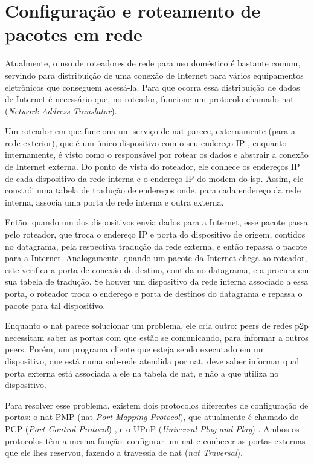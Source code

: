 
\section{Configuração e roteamento de pacotes em rede}

Atualmente, o uso de roteadores de rede para uso doméstico é bastante comum, servindo
para distribuição de uma conexão de Internet para vários equipamentos eletrônicos que
conseguem acessá-la. Para que ocorra essa distribuição de dados de Internet é
necessário que, no roteador, funcione um protocolo chamado \gls{nat}
(\emph{Network Address Translator}).

Um roteador em que funciona um serviço de \gls*{nat} parece, externamente (para a rede
exterior), que é um único dispositivo com o seu endereço IP \cite{book:kurose}, enquanto
internamente, é visto como o responsável por rotear os dados e abstrair a conexão de
Internet externa. Do ponto de vista do roteador, ele conhece os endereços IP de cada
dispositivo da rede interna e o endereço IP do modem do \gls{isp}. Assim, ele constrói
uma tabela de tradução de endereços onde, para cada endereço da rede interna, associa
uma porta de rede interna e outra externa.

Então, quando um dos dispositivos envia dados para a Internet, esse pacote passa pelo
roteador, que troca o endereço IP e porta do dispositivo de origem, contidos no
datagrama, pela respectiva tradução da rede externa, e então repassa o pacote para a
Internet. Analogamente, quando um pacote da Internet chega ao roteador, este verifica a
porta de conexão de destino, contida no datagrama, e a procura em sua tabela de
tradução. Se houver um dispositivo da rede interna associado a essa porta, o roteador
troca o endereço e porta de destinos do datagrama e repassa o pacote para tal
dispositivo.

Enquanto o \gls*{nat} parece solucionar um problema, ele cria outro: \glspl*{peer}
de redes \gls*{p2p} necessitam saber as portas com que estão se comunicando, para
informar a outros \glspl*{peer}. Porém, um programa cliente que esteja sendo executado
em um dispositivo, que está numa sub-rede atendida por \gls*{nat}, deve saber informar
qual porta externa está associada a ele na tabela de \gls*{nat}, e não a que utiliza
no dispositivo.

Para resolver esse problema, existem dois protocolos diferentes de configuração de
portas: o \gls*{nat} PMP (\gls*{nat} \emph{Port Mapping Protocol}), que atualmente é
chamado de PCP (\emph{Port Control Protocol}) \cite{site:rfcpcp}, e o UPnP
(\emph{Universal Plug and Play}) \cite{site:rfcupnp}. Ambos os protocolos têm a mesma
função: configurar um \gls*{nat} e conhecer as portas externas que ele lhes reservou,
fazendo a travessia de \gls*{nat} (\emph{\gls*{nat} Traversal}).

